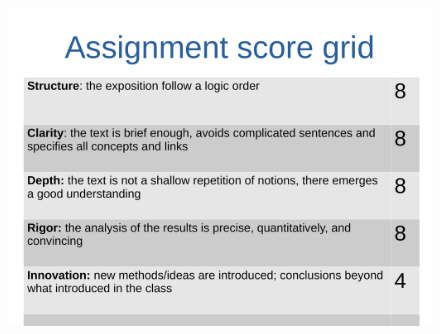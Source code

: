\documentclass[prl,twocolumn]{revtex4-1}
\begin{document}
\begin{figure}[!tb]
  \centering
  \includegraphics[width=\textwidth]{description_assignment_LCPB_20-21.pdf}
\end{figure}
\end{document}
